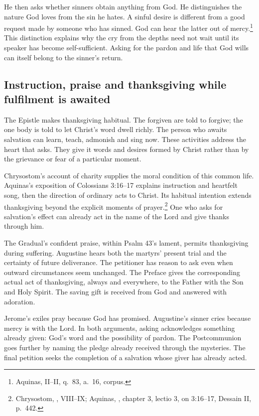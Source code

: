 He then asks whether sinners obtain anything from God. He distinguishes
the nature God loves from the sin he hates. A sinful desire is different
from a good request made by someone who has sinned. God can hear the
latter out of mercy.\footnote{Aquinas, 
II--II, q.~83, a.~16, corpus.} This distinction explains why the cry
from the depths need not wait until its speaker has become
self-sufficient. Asking for the pardon and life that God wills can
itself belong to the sinner's return.

\subsection{Instruction, praise and thanksgiving while fulfilment is awaited}
The Epistle makes thanksgiving habitual. The forgiven are told to
forgive; the one body is told to let Christ's word dwell richly.
The person who awaits salvation can learn, teach, admonish and sing
now. These activities address the heart that asks. They give it
words and desires formed by Christ rather than by the grievance or
fear of a particular moment.

Chrysostom's account of charity supplies the moral condition of this
common life. Aquinas's exposition of Colossians 3:16--17 explains
instruction and heartfelt song, then the direction of ordinary acts
to Christ. Its habitual intention extends thanksgiving beyond the
explicit moments of prayer.\footnote{Chrysostom, , VIII--IX; Aquinas, ,
chapter 3, lectio 3, on 3:16--17, Dessain II, p.~442.}
One who asks for salvation's effect can already act in the name of
the Lord and give thanks through him.

The Gradual's confident praise, within Psalm 43's lament, permits
thanksgiving during suffering. Augustine hears both the martyrs'
present trial and the certainty of future deliverance. The petitioner
has reason to ask even when outward circumstances seem unchanged.
The Preface gives the corresponding actual act of thanksgiving,
always and everywhere, to the Father with the Son and Holy Spirit.
The saving gift is received from God and answered with adoration.

Jerome's exiles pray because God has promised. Augustine's sinner
cries because mercy is with the Lord. In both arguments, asking
acknowledges something already given: God's word and the possibility
of pardon. The Postcommunion goes further by naming the pledge already
received through the mysteries. The final petition seeks the completion
of a salvation whose giver has already acted.

